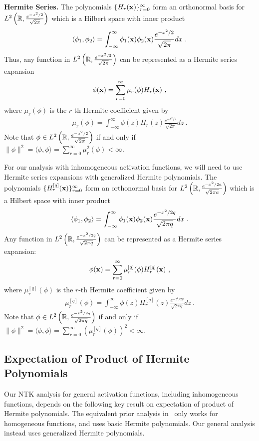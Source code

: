 {\bf Hermite Series.} The polynomials $\{ H_r(\mathbf{x}) \}_{r=0}^{\infty}$ form an orthonormal basis for $L^2\left(\mathbb{R},\frac{e^{-x^2/2}}{\sqrt{2\pi}}\right)$ which is a Hilbert space with inner product
\begin{align}
\langle \phi_1, \phi_2 \rangle = \int_{-\infty}^{\infty} \phi_1(\mathbf{x}) \phi_2(\mathbf{x}) \frac{e^{-x^2/2}}{\sqrt{2\pi}} dx ~.
\end{align}
Thus, any function in $L^2\left(\mathbb{R},\frac{e^{-x^2/2}}{\sqrt{2\pi}}\right)$ can be represented as a Hermite series expansion
\begin{align}
    \phi(\mathbf{x}) = \sum_{r=0}^{\infty} \mu_r(\phi) H_r(\mathbf{x}) ~,
\end{align}
where $\mu_r(\phi)$ is the $r$-th Hermite coefficient given by
\begin{align}
\mu_r(\phi) = \int_{-\infty}^{\infty} \phi(z) H_r(z) \frac{e^{-z^2/2}}{\sqrt{2\pi}} dz ~.
\end{align}
Note that $\phi \in L^2\left(\mathbb{R},\frac{e^{-x^2/2}}{\sqrt{2\pi}}\right)$ if and only if $\| \phi \|^2 = \langle \phi,\phi \rangle = \sum_{r=0}^{\infty} \mu_r^2(\phi) < \infty$.

For our analysis with inhomogeneous activation functions, we will need to use Hermite series expansions with generalized Hermite polynomials. The polynomials $\{ H_r^{[q]}(\mathbf{x}) \}_{r=0}^{\infty}$ form an orthonormal basis for $L^2\left(\mathbb{R},\frac{e^{-x^2/2a}}{\sqrt{2\pi a}}\right)$ which is a Hilbert space with inner product
\begin{align}
\langle \phi_1, \phi_2 \rangle = \int_{-\infty}^{\infty} \phi_1(\mathbf{x}) \phi_2(\mathbf{x}) \frac{e^{-x^2/2q}}{\sqrt{2\pi q}} dx ~.
\end{align}
Any function in $L^2\left(\mathbb{R},\frac{e^{-x^2/2q}}{\sqrt{2\pi q}}\right)$ can be represented as a Hermite series expansion:
\begin{align}
    \phi(\mathbf{x}) = \sum_{r=0}^{\infty} \mu_r^{[q]}(\phi) H_r^{[q]}(\mathbf{x}) ~,
\end{align}
where $\mu_r^{[q]}(\phi)$ is the $r$-th Hermite coefficient given by
\begin{align}
\mu_r^{[q]}(\phi) = \int_{-\infty}^{\infty} \phi(z) H_r^{[q]}(z) \frac{e^{-z^2/2q}}{\sqrt{2\pi q}} dz ~.
\end{align}
Note that $\phi \in L^2\left(\mathbb{R},\frac{e^{-x^2/2q}}{\sqrt{2\pi q}}\right)$ if and only if $\| \phi \|^2 = \langle \phi,\phi \rangle = \sum_{r=0}^{\infty} (\mu_r^{[q]}(\phi))^2 < \infty$.


\subsection{Expectation of Product of Hermite Polynomials}
Our NTK analysis for general activation functions, including inhomogeneous functions, depends on the following key result on expectation of product of Hermite polynomials. The equivalent prior analysis in~\citep{oymak2020hermite,ng2020hermite1,ng2021hermite2} only works for homogeneous functions, and uses basic Hermite polynomials. Our general analysis instead uses generalized Hermite polynomials.

